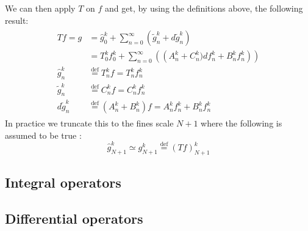 \documentclass[../master_thesis.tex]{subfiles}
\begin{document}
We can then apply $T$ on $f$ and get, by using the definitions above, the following
result:
\begin{align}
  \begin{split}
    Tf = g &= \hat{g}^k_0 + \sum^\infty_{n=0}\left(\tilde{g}^k_n + d\tilde{g}^k_n\right)\\
       &= T^k_0f^k_0 +  \sum^\infty_{n=0}\left(\left(A_n^k + C_n^k)df^k_n + B^k_nf^k_n\right)\right)\\
       \hat{g}^k_n &\stackrel{\text{def}}{=} T^k_nf = T^k_nf^k_n\\
       \tilde{g}^k_n &\stackrel{\text{def}}{=} C^k_nf = C^k_nf^k_n\\
       d\tilde{g}^k_n &\stackrel{\text{def}}{=}\left(A^k_n + B^k_n\right)f = A^k_nf^k_n + B^k_nf^k_n
  \end{split}
\end{align}
In practice we truncate this to the fines scale $N+1$ where the following is assumed to be true \cite{Frediani:2013}:
\begin{equation}
  \hat{g}^k_{N+1} \simeq g^k_{N+1} \stackrel{\text{def}}{=} (Tf)^k_{N+1}
\end{equation}

\subsection{Integral operators}

\subsection{Differential operators}


\biblio
\end{document}
